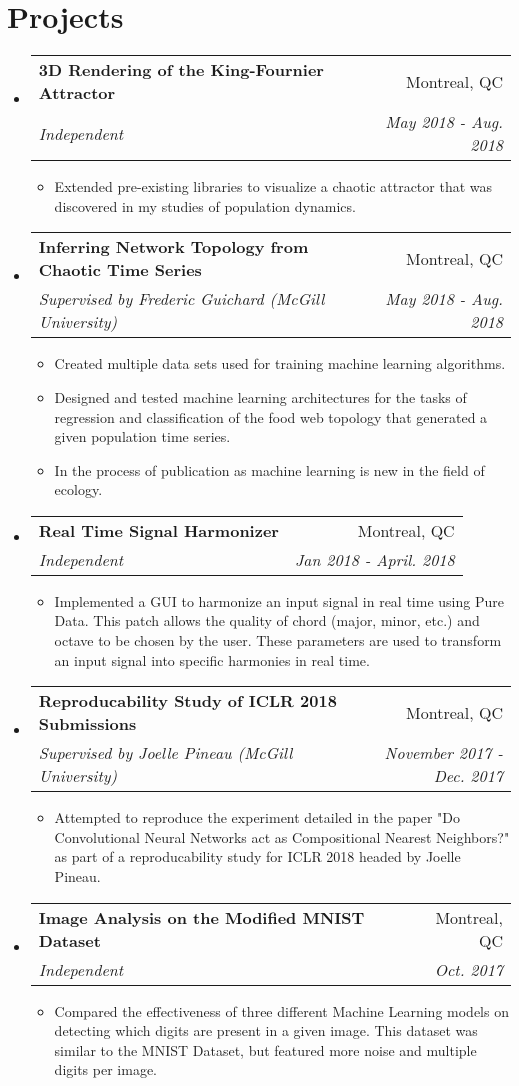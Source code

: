 \documentclass[letterpaper,11pt]{article}
\makeatletter
\newcommand{\resitem}[1]{\item #1 \vspace{-2pt}}
\newcommand{\ressubheading}[4]{
\begin{tabular*}{6.1in}{l@{\extracolsep{\fill}}r}
		\textbf{#1} & #2 \\
		\textit{#3} & \textit{#4} \\
\end{tabular*}\vspace{-1pt}}
\makeatother
\begin{document}
\section*{Projects}
\begin{itemize}
\item
	\ressubheading{3D Rendering of the King-Fournier Attractor}{Montreal, QC}{Independent}{May 2018 - Aug. 2018}
	\begin{itemize}
		\resitem{Extended pre-existing libraries to visualize a chaotic attractor that was discovered in my studies of population dynamics.}
	\end{itemize}

\item
	\ressubheading{Inferring Network Topology from Chaotic Time Series}{Montreal, QC}{Supervised by Frederic Guichard (McGill University)}{May 2018 - Aug. 2018}
	\begin{itemize}
		\resitem{Created multiple data sets used for training machine learning algorithms.}
		\resitem{Designed and tested machine learning architectures for the tasks of regression and classification of the food web topology that generated a given population time series.}
		\resitem{In the process of publication as machine learning is new in the field of ecology.}
	\end{itemize}
	
\item
	\ressubheading{Real Time Signal Harmonizer}{Montreal, QC}{Independent}{Jan 2018 - April. 2018}
	\begin{itemize}
		\resitem{Implemented a GUI to harmonize an input signal in real time using Pure Data. This patch allows the quality of chord (major, minor, etc.) and octave to be chosen by the user. These parameters are used to transform an input signal into specific harmonies in real time.}
	\end{itemize}	
	
\item
	\ressubheading{Reproducability Study of ICLR 2018 Submissions}{Montreal, QC}{Supervised by Joelle Pineau (McGill University)}{November 2017 - Dec. 2017}
	\begin{itemize}
		\resitem{Attempted to reproduce the experiment detailed in the paper "Do Convolutional Neural Networks act as Compositional Nearest Neighbors?" as part of a reproducability study for ICLR 2018 headed by Joelle Pineau.}
	\end{itemize}	

\item
	\ressubheading{Image Analysis on the Modified MNIST Dataset}{Montreal, QC}{Independent}{Oct. 2017}
	\begin{itemize}
		\resitem{Compared the effectiveness of three different Machine Learning models on detecting which digits are present in a given image. This dataset was similar to the MNIST Dataset, but featured more noise and multiple digits per image. }
	\end{itemize}
	

\end{itemize}
\end{document}
